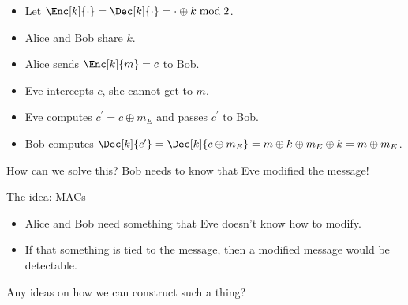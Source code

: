 \begin{frame}
  \begin{example}
    \begin{itemize}
      \item Let \(\Enc[k]{\cdot} = \Dec[k]{\cdot} = \cdot\oplus k\bmod 2\).
        
        \pause{}

      \item Alice and Bob share \(k\).
      \item Alice sends \(\Enc[k]{m} = c\) to Bob.

        \pause{}

      \item Eve intercepts \(c\), she cannot get to \(m\).

        \pause{}

      \item Eve computes \(c^\prime = c\oplus m_E\) and passes \(c^\prime\) to 
        Bob.

        \pause{}

      \item Bob computes \(\Dec[k]{c^\prime} = \Dec[k]{c\oplus m_E} = m\oplus 
          k\oplus m_E\oplus k = m\oplus m_E\).
    \end{itemize}
  \end{example}

  \pause{}
  
  \begin{exercise}
    How can we solve this?
    Bob needs to know that Eve modified the message!
  \end{exercise}
\end{frame}

\begin{frame}
  \begin{block}{The idea: \acp{MAC}}
    \begin{itemize}
      \item Alice and Bob need something that Eve doesn't know how to modify.

        \pause{}

      \item If that something is tied to the message, then a modified message 
        would be detectable.
    \end{itemize}
  \end{block}

  \pause{}

  \begin{exercise}
    Any ideas on how we can construct such a thing?
  \end{exercise}
\end{frame}

